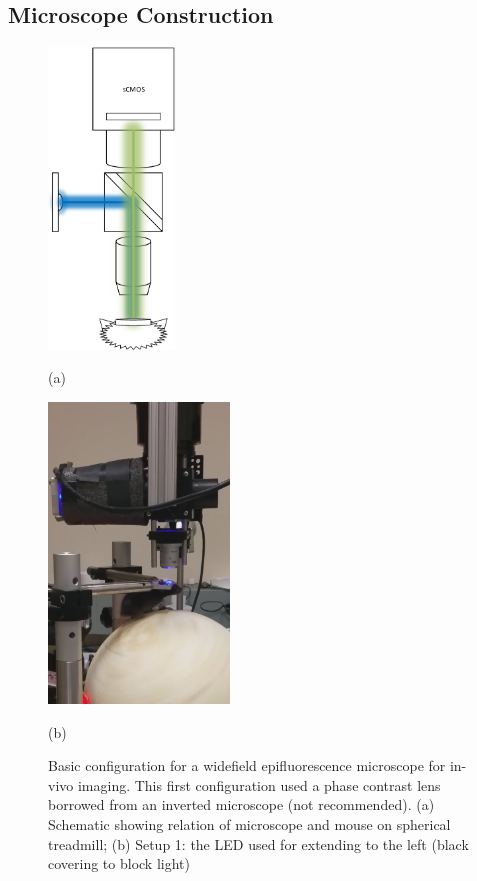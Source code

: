 \subsection{Microscope Construction}\label{microscope-construction}

\begin{figure}[htb]
  \begin{minipage}[t]{0.49\linewidth}\centering
    \includegraphics[height=8cm]{2_Body/Figures/widefield_microscope_diagram.png}
    \medskip
    \centerline{(a)}
  \end{minipage}\hfill
  \begin{minipage}[t]{0.49\linewidth}\centering
    \includegraphics[height=8cm]{2_Body/Figures/setup1.jpg}
    \medskip
    \centerline{(b)}
  \end{minipage}
  \caption{Basic configuration for a widefield epifluorescence microscope for
in-vivo imaging. This first configuration used a phase contrast lens
borrowed from an inverted microscope (not recommended). (a) Schematic showing relation of microscope and mouse on spherical treadmill; (b) Setup 1: the LED used for extending to the left (black covering to block light)}
  \label{fig:Sampling}
\end{figure}


